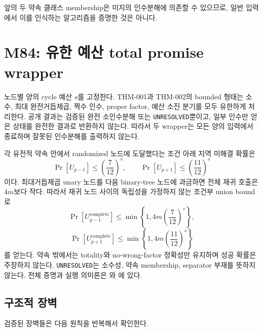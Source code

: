 \documentclass[11pt]{article}
\begin{document}
앞의 두 약속 클래스 membership은 미지의 인수분해에 의존할 수
있으므로, 일반 입력에서 이를 인식하는 알고리즘을 증명한 것은
아니다.

\section{M84: 유한 예산 total promise wrapper}

노드별 양의 cycle 예산 \(s\)를 고정한다. THM-001과 THM-002의 bounded
형태는 소수, 최대 완전거듭제곱, 짝수 인수, proper factor, 예산 소진
분기를 모두 유한하게 처리한다. 공개 결과는 검증된 완전
소인수분해 또는 \texttt{UNRESOLVED}뿐이고, 일부 인수만 얻은 상태를
완전한 결과로 반환하지 않는다. 따라서 두 wrapper는 모든 양의
입력에서 종료하며 잘못된 인수분해를 출력하지 않는다.

각 유전적 약속 안에서 randomized 노드에 도달했다는 조건 아래 지역
미해결 확률은
\[
\Pr[U_{p-1}]\le\left(\frac7{12}\right)^s,\qquad
\Pr[U_{p+1}]\le\left(\frac{11}{12}\right)^s
\]
이다. 최대거듭제곱 unary 노드를 다음 binary-tree 노드에 과금하면
전체 재귀 호출은 \(4m\)보다 작다. 따라서 재귀 노드 사이의 독립성을
가정하지 않는 조건부 union bound로
\[
\Pr[U^{\mathrm{complete}}_{p-1}]
\le\min\left\{1,4m\left(\frac7{12}\right)^s\right\},
\]
\[
\Pr[U^{\mathrm{complete}}_{p+1}]
\le\min\left\{1,4m\left(\frac{11}{12}\right)^s\right\}
\]
를 얻는다. 약속 밖에서는 totality와 no-wrong-factor 정확성만
유지하며 성공 확률은 주장하지 않는다. \texttt{UNRESOLVED}는 소수성,
약속 membership, separator 부재를 뜻하지 않는다. 전체 증명과 실행
의미론은 와
에 있다.

\subsection{구조적 장벽}

검증된 장벽들은 다음 원칙을 반복해서 확인한다.
\end{document}
